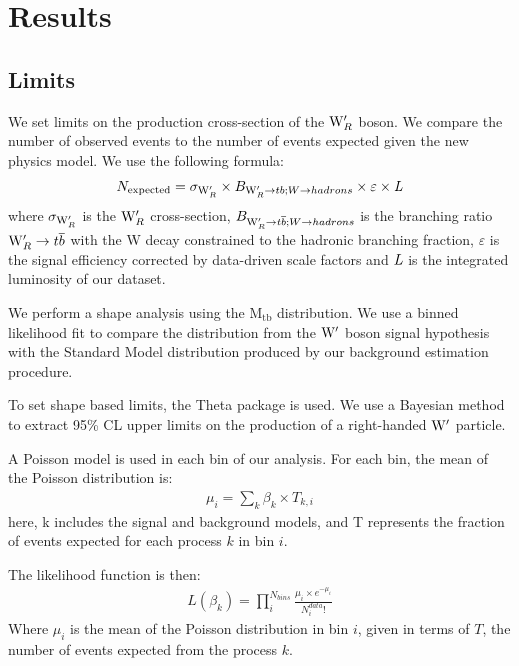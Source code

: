 \clearpage
\newpage
\section{Results}
\subsection{Limits}
\label{sec:stats}
We set limits on the production cross-section of 
the $\mathrm{W}^\prime_R$ boson. We compare the number 
of observed events to the number of events expected given the new physics model. We use the following formula:
\begin{eqnarray}
N_{\textrm{expected}} = \sigma_{\mathrm{W}^\prime_R} \times B_{\mathrm{W}^\prime_R \rightarrow tb;W \to hadrons} \times \varepsilon \times \emph{L}
\end{eqnarray}
where $\sigma_{\mathrm{W}^\prime_R}$ is the $\mathrm{W}^\prime_R$ cross-section, $B_{\mathrm{W}^\prime_R \rightarrow {t\overline{b}};W \to hadrons}$ is the branching ratio 
$\mathrm{W}^\prime_R \to {t\overline{b}}$ with the W decay constrained to the hadronic branching fraction, $\varepsilon$ is the signal efficiency corrected by data-driven scale factors and $\emph{L}$ is the integrated luminosity of our dataset. 

We perform a shape analysis using the $\mathrm{M_{tb}}$ distribution.  We use a binned likelihood fit to compare the distribution from the $\mathrm{W}^\prime$ boson signal 
hypothesis with the Standard Model distribution produced by our background estimation procedure.  

\label{sec:Theta}
To set shape based limits, the Theta package \cite{theta} is used.  We use a Bayesian method to extract 95\% CL upper limits 
on the production of a right-handed $\mathrm{W}^\prime$ particle.  

A Poisson model is used in each bin of our analysis.  For each bin, the mean of the Poisson distribution is:
\begin{eqnarray}
\mu_i = \sum_k \beta_k \times T_{k,i}
\end{eqnarray}
here, k includes the signal and background models, and T represents the fraction of events expected for each process $k$ in bin $i$.

The likelihood function is then:
\begin{eqnarray}
L(\beta_k) = \prod^{N_{bins}}_i \frac{\mu_i \times e^{-\mu_i}}{N^{data}_i!}
\end{eqnarray}
Where $\mu_i$ is the mean of the Poisson distribution in bin $i$, given in terms of $T$, the number of events expected from the process $k$.

